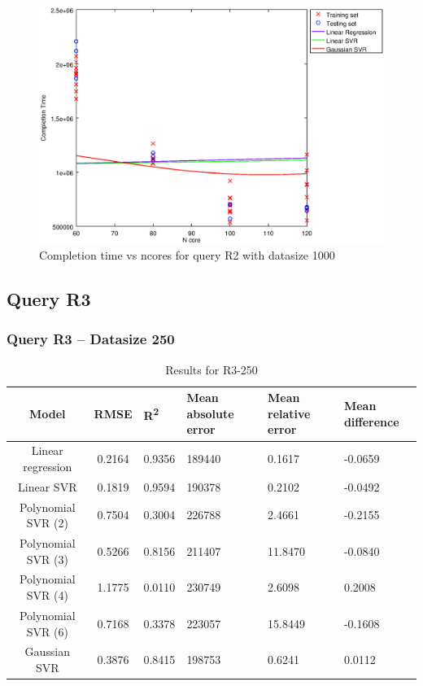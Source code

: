 \documentclass[a4paper,11pt]{article}
\begin{document}
\begin {figure}[hbtp]
\centering
\includegraphics[width=\textwidth]{output/R2_1000_LINEAR_NCORE/plot_R2_1000_bestmodels.eps}
\caption{Completion time vs ncores for query R2 with datasize 1000}
\label{fig:all_linear_R2_1000}
\end {figure}

\newpage
\subsection{Query R3}
\subsubsection{Query R3 -- Datasize 250}
\begin{table}[H]
	\centering
	\begin{adjustbox}{center}
		\begin{tabular}{c | c M{1.2cm} M{2.5cm} M{2.5cm} M{1.8cm}}
			Model & RMSE & R\textsuperscript{2} & Mean absolute error & Mean relative error & Mean difference \tabularnewline
			\hline
			Linear regression & 0.2164 & 0.9356 & 189440 & 0.1617 & -0.0659 \\
			Linear SVR & 0.1819 & 0.9594 & 190378 & 0.2102 & -0.0492 \\
			Polynomial SVR (2) & 0.7504 & 0.3004 & 226788 & 2.4661 & -0.2155 \\
			Polynomial SVR (3) & 0.5266 & 0.8156 & 211407 & 11.8470 & -0.0840 \\
			Polynomial SVR (4) & 1.1775 & 0.0110 & 230749 & 2.6098 & 0.2008 \\
			Polynomial SVR (6) & 0.7168 & 0.3378 & 223057 & 15.8449 & -0.1608 \\
			Gaussian SVR & 0.3876 & 0.8415 & 198753 & 0.6241 & 0.0112 \\
		\end{tabular}
	\end{adjustbox}
	\\
	\caption{Results for R3-250}
	\label{fig:all_linear_R3_250}
\end{table}
\end{document}
